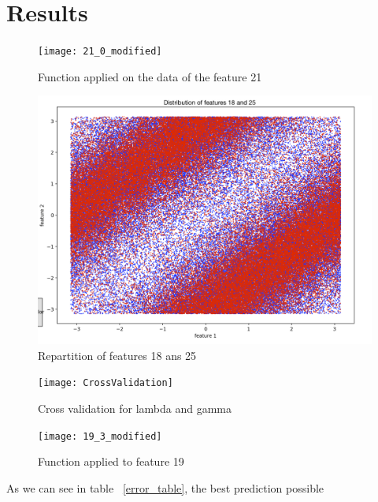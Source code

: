 \documentclass[10pt,conference,compsocconf]{IEEEtran}
\begin{document}
	\section{Results}
	\begin{figure}[tbp]
		\centering
		\texttt{[image: 21\_0\_modified]}
		\caption{Function applied on the data of the feature 21}
		\vspace{-3mm}
		\label{fig:feature21function}
	\end{figure}
	\begin{figure}[tbp]
		\centering
		\includegraphics[width=\columnwidth]{features18_25}
		\caption{Repartition of features 18 ans 25}
		\vspace{-3mm}
		\label{fig:feature1825}
	\end{figure}
	\begin{figure}[tbp]
		\centering
		\texttt{[image: CrossValidation]}
		\caption{Cross validation for lambda and gamma}
		\vspace{-3mm}
		\label{fig:crossValidation}
	\end{figure}
	\begin{figure}[tbp]
		\centering
		\texttt{[image: 19\_3\_modified]}
		\caption{Function applied to feature 19}
		\vspace{-3mm}
		\label{fig:feature19}
	\end{figure}
	As we can see in table ~\ref{error_table}, the best prediction possible 
\end{document}
